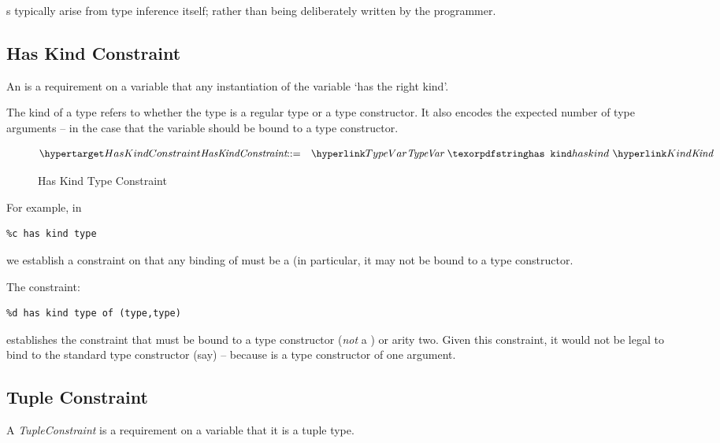 \begin{aside}
s typically arise from type inference itself; rather than being deliberately written by the programmer. 
\end{aside}


\subsection{Has Kind Constraint}
\label{hasKindConstraint}
An  is a requirement on a variable that any instantiation of the variable `has the right kind'.

The kind of a type refers to whether the type is a regular type or a type constructor. It also encodes the expected number of type arguments -- in the case that the variable should be bound to a type constructor.

\begin{figure}[htbp]
\begin{eqnarray*}
\ntDef{HasKindConstraint}&\arrow&\ntRef{TypeVar}\ \q{has kind}\ \ntRef{Kind}
\end{eqnarray*}
\caption{Has Kind Type Constraint}
\label{hasKindConstraintFig}
\end{figure}

For example, in 
\begin{lstlisting}
%c has kind type
\end{lstlisting}
we establish a constraint on  that any binding of  must be a  (in particular, it may not be bound to a type constructor.

The constraint:
\begin{lstlisting}
%d has kind type of (type,type)
\end{lstlisting}
establishes the constraint that  must be bound to a type constructor (\emph{not} a ) or arity two. Given this constraint, it would not be legal to bind  to the standard type constructor  (say) -- because  is a type constructor of one argument.

\subsection{Tuple Constraint}
\label{tupleConstraint}

A \emph{TupleConstraint} is a requirement on a variable that it is a tuple type.

